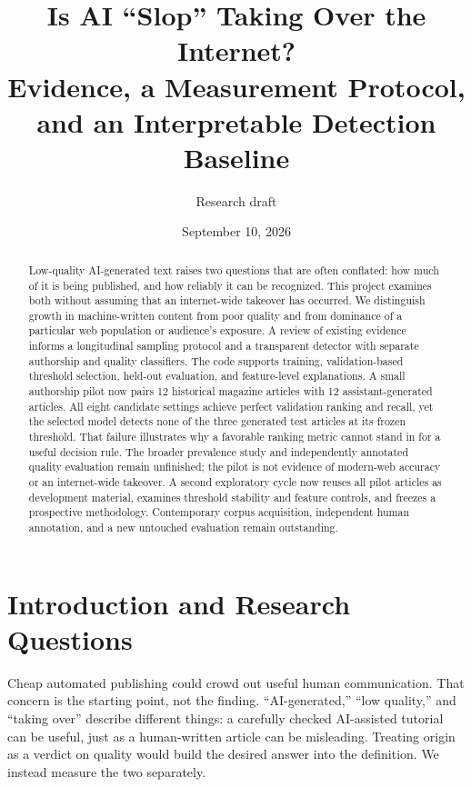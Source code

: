 \documentclass[11pt]{article}
\title{Is AI ``Slop'' Taking Over the Internet?\\
\large Evidence, a Measurement Protocol, and an Interpretable Detection Baseline}
\author{Research draft}
\date{September 10, 2026}
\begin{document}
\maketitle

\begin{abstract}
Low-quality AI-generated text raises two questions that are often conflated:
how much of it is being published, and how reliably it can be recognized.
This project examines both without assuming that an internet-wide takeover
has occurred. We distinguish growth in machine-written content from poor
quality and from dominance of a particular web population or audience's
exposure. A review of existing evidence informs a longitudinal sampling
protocol and a transparent detector with separate authorship and quality
classifiers. The code supports training, validation-based threshold selection,
held-out evaluation, and feature-level explanations. A small authorship pilot
now pairs 12 historical magazine articles with 12 assistant-generated articles.
All eight candidate settings achieve perfect validation ranking and recall,
yet the selected model detects none of the three generated test articles at
its frozen threshold. That failure illustrates why a favorable ranking metric
cannot stand in for a useful decision rule. The broader prevalence study and
independently annotated quality evaluation remain unfinished; the pilot is
not evidence of modern-web accuracy or an internet-wide takeover. A second
exploratory cycle now reuses all pilot articles as development material,
examines threshold stability and feature controls, and freezes a prospective
methodology. Contemporary corpus acquisition, independent human annotation,
and a new untouched evaluation remain outstanding.
\end{abstract}

\section{Introduction and Research Questions}
Cheap automated publishing could crowd out useful human communication. That
concern is the starting point, not the finding. ``AI-generated,'' ``low
quality,'' and ``taking over'' describe different things: a carefully checked
AI-assisted tutorial can be useful, just as a human-written article can be
misleading. Treating origin as a verdict on quality would build the desired
answer into the definition. We instead measure the two separately.
\end{document}
